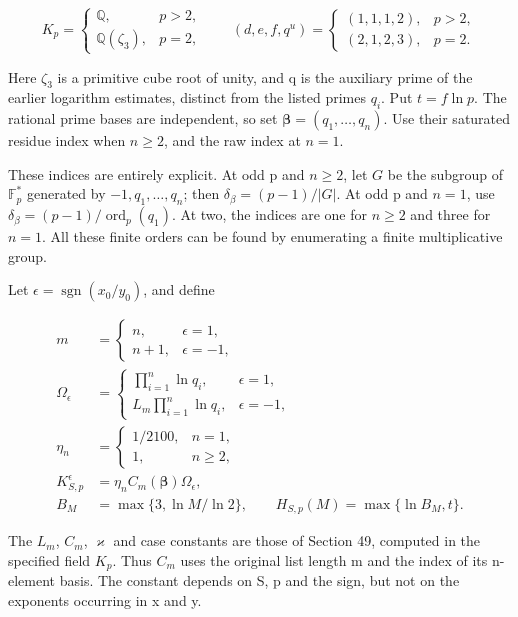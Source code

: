 \documentclass[
  11pt,
  a4paper,
]{article}
\begin{document}
\[
K_p=\begin{cases}\mathbb Q,&p>2,\\
\mathbb Q(\zeta_3),&p=2,\end{cases}
\qquad
(d,e,f,q^u)=\begin{cases}(1,1,1,2),&p>2,\\
(2,1,2,3),&p=2.
\end{cases}
\tag{10.511}
\]

Here \(\zeta_3\) is a primitive cube root of unity, and q is the
auxiliary prime of the earlier logarithm estimates, distinct from the
listed primes \(q_i\). Put \(t=f\ln p\). The rational prime bases are
independent, so set \(\boldsymbol\beta=(q_1,\ldots,q_n)\). Use their
saturated residue index when \(n\ge2\), and the raw index at \(n=1\).

These indices are entirely explicit. At odd p and \(n\ge2\), let \(G\)
be the subgroup of \(\mathbb F_p^*\) generated by \(-1,q_1,\ldots,q_n\);
then \(\delta_\beta=(p-1)/|G|\). At odd p and \(n=1\), use
\(\delta_\beta=(p-1)/\operatorname{ord}_p(q_1)\). At two, the indices
are one for \(n\ge2\) and three for \(n=1\). All these finite orders can
be found by enumerating a finite multiplicative group.

Let \(\epsilon=\operatorname{sgn}(x_0/y_0)\), and define

\[
\begin{aligned}
m&=\begin{cases}n,&\epsilon=1,\\n+1,&\epsilon=-1,\end{cases}\\
\Omega_\epsilon&=\begin{cases}
\displaystyle\prod_{i=1}^n\ln q_i,&\epsilon=1,\\
\displaystyle L_m\prod_{i=1}^n\ln q_i,&\epsilon=-1,
\end{cases}\\
\eta_n&=\begin{cases}1/2100,&n=1,\\1,&n\ge2,\end{cases}\\
K_{S,p}^{\epsilon}&=\eta_n C_m(\boldsymbol\beta)\Omega_\epsilon,\\
B_M&=\max\{3,\ln M/\ln2\},\qquad
H_{S,p}(M)=\max\{\ln B_M,t\}.
\end{aligned}
\tag{10.512}
\]

The \(L_m\), \(C_m\), \(\varkappa\) and case constants are those of
Section 49, computed in the specified field \(K_p\). Thus \(C_m\) uses
the original list length m and the index of its n-element basis. The
constant depends on S, p and the sign, but not on the exponents
occurring in x and y.
\end{document}
